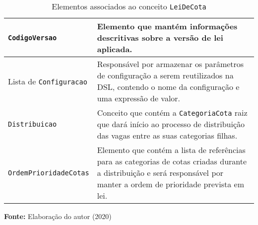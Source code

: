 \begin{table}[ht]
\caption{Elementos associados ao conceito \texttt{LeiDeCota}}
\label{tblelementoslei}
\centering
\begin{tabular}{|p{4.2cm}|p{10cm}|}
\hline
\texttt{CodigoVersao}          & Elemento que mantém informações descritivas sobre a versão de lei aplicada.                                                                                           \\ \hline
Lista de \texttt{Configuracao} & Responsável por armazenar os parâmetros de configuração a serem reutilizados na DSL, contendo o nome da configuração e uma expressão de valor.                          \\ \hline
\texttt{Distribuicao}          & Conceito que contém a \texttt{CategoriaCota} raiz que dará início ao processo de distribuição das vagas entre as suas categorias filhas.                                       \\ \hline
\texttt{OrdemPrioridadeCotas}  & Elemento que contém a lista de referências para as categorias de cotas criadas durante a distribuição e será responsável por manter a ordem de prioridade prevista em lei. \\ \hline
\end{tabular}
  \par\medskip\textbf{Fonte:} Elaboração do autor (2020) \par\medskip
\end{table}

   
    